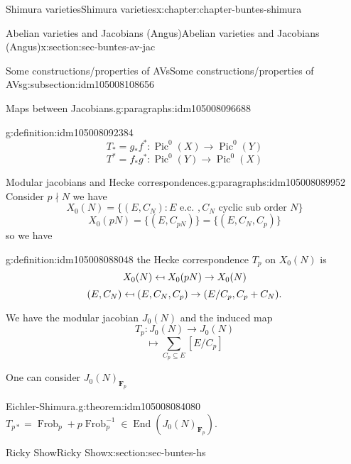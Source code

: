 \documentclass[oneside,10pt,]{book}
\numberwithin{equation}{section}
\newcommand{\inv}{^{-1}}
\providecommand\mapsfrom{\mathrel{\reflectbox{\ensuremath{\mapsto}}}}
\newcommand{\FF}{\mathbf{F}}
\DeclareMathOperator{\End}{End}
\DeclareMathOperator{\Pic}{Pic}
\DeclareMathOperator{\Frob}{Frob}
\begin{document}
\begin{chapterptx}{Shimura varieties}{}{Shimura varieties}{}{}{x:chapter:chapter-buntes-shimura}
\begin{sectionptx}{Abelian varieties and Jacobians (Angus)}{}{Abelian varieties and Jacobians (Angus)}{}{}{x:section:sec-buntes-av-jac}
\begin{subsectionptx}{Some constructions\slash{}properties of AVs}{}{Some constructions\slash{}properties of AVs}{}{}{g:subsection:idm105008108656}
\begin{paragraphs}{Maps between Jacobians.}{g:paragraphs:idm105008096688}
\begin{definition}{}{g:definition:idm105008092384}
\begin{equation*}
T_* = g_* f^* \colon \Pic^0(X) \to \Pic^0(Y)
\end{equation*}
%
\begin{equation*}
T^* = f_* g^* \colon \Pic^0(Y) \to \Pic^0(X)
\end{equation*}
%
\end{definition}
\end{paragraphs}%
\begin{paragraphs}{Modular jacobians and Hecke correspondences.}{g:paragraphs:idm105008089952}%
Consider \(p\nmid N\) we have%
\begin{equation*}
X_0(N) = \{ (E,C_N) : E\text{ e.c. }, C_N \text{ cyclic sub order } N\}
\end{equation*}
%
\begin{equation*}
X_0(pN) = \{(E,C_{pN})\} = \{(E,C_N,C_p)\}
\end{equation*}
so we have%
\begin{definition}{}{g:definition:idm105008088048}%
the Hecke correspondence \(T_p\) on \(X_0(N)\) is%
\begin{equation*}
X_0(N) \mapsfrom X_0(pN) \to X_0(N)
\end{equation*}
%
\begin{equation*}
(E,C_N)\mapsfrom (E,C_N,C_p)\to (E/C_p, C_p + C_N)\text{.}
\end{equation*}
%
\end{definition}
We have the modular jacobian \(J_0(N)\) and the induced map%
\begin{equation*}
T_p \colon J_0(N) \to J_0(N)
\end{equation*}
%
\begin{equation*}
[E] \mapsto \sum_{C_p \subseteq E} [E/C_p]
\end{equation*}
%
\par
One can consider \(J_0(N)_{\FF_p}\)%
\begin{theorem}{Eichler-Shimura.}{}{g:theorem:idm105008084080}%
\(T_{p*} = \Frob_p + p \Frob_p\inv \in \End(J_0(N)_{\FF_p})\).%
\end{theorem}
\end{paragraphs}%
\end{subsectionptx}
\end{sectionptx}
%
%
\typeout{************************************************}
\typeout{************************************************}
%
\begin{sectionptx}{Ricky Show}{}{Ricky Show}{}{}{x:section:sec-buntes-hs}
%
%
\typeout{************************************************}

\end{sectionptx}
\end{chapterptx}
\end{document}

